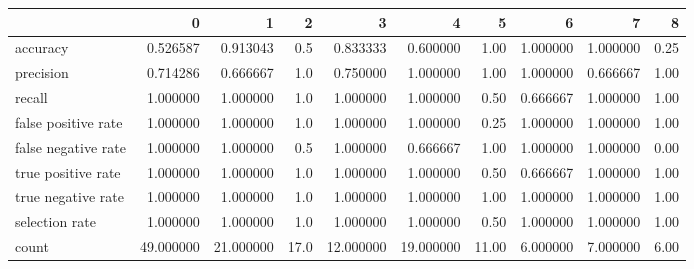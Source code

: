 \begin{tabular}{lrrrrrrrrr}
\toprule
{} &          0 &          1 &     2 &          3 &          4 &      5 &         6 &         7 &     8 \\
\midrule
accuracy            &   0.526587 &   0.913043 &   0.5 &   0.833333 &   0.600000 &   1.00 &  1.000000 &  1.000000 &  0.25 \\
precision           &   0.714286 &   0.666667 &   1.0 &   0.750000 &   1.000000 &   1.00 &  1.000000 &  0.666667 &  1.00 \\
recall              &   1.000000 &   1.000000 &   1.0 &   1.000000 &   1.000000 &   0.50 &  0.666667 &  1.000000 &  1.00 \\
false positive rate &   1.000000 &   1.000000 &   1.0 &   1.000000 &   1.000000 &   0.25 &  1.000000 &  1.000000 &  1.00 \\
false negative rate &   1.000000 &   1.000000 &   0.5 &   1.000000 &   0.666667 &   1.00 &  1.000000 &  1.000000 &  0.00 \\
true positive rate  &   1.000000 &   1.000000 &   1.0 &   1.000000 &   1.000000 &   0.50 &  0.666667 &  1.000000 &  1.00 \\
true negative rate  &   1.000000 &   1.000000 &   1.0 &   1.000000 &   1.000000 &   1.00 &  1.000000 &  1.000000 &  1.00 \\
selection rate      &   1.000000 &   1.000000 &   1.0 &   1.000000 &   1.000000 &   0.50 &  1.000000 &  1.000000 &  1.00 \\
count               &  49.000000 &  21.000000 &  17.0 &  12.000000 &  19.000000 &  11.00 &  6.000000 &  7.000000 &  6.00 \\
\bottomrule
\end{tabular}
